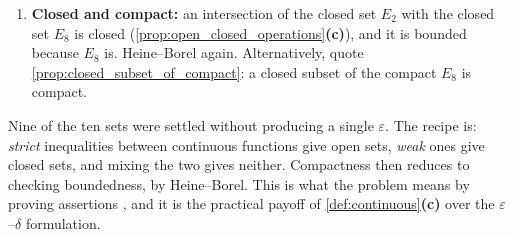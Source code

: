 \begin{exercisesolution}
\begin{enumerate}[label=\textbf{\arabic*.}]
    \begin{ainote}
    The official solution opens this part with . That
    is a slip: $E_8 = [-6,6]^n$ is bounded --- it is $E_3$ that is unbounded, as the official
    solution itself established two parts earlier. The conclusion (that $E_9$ is not compact) is
    correct; only the reason is misattributed.
    \end{ainote}
  \item \textbf{Closed and compact:} an intersection of the closed set $E_2$ with the closed
    set $E_8$ is closed (\cref{prop:open_closed_operations}\textbf{(c)}), and it is bounded
    because $E_8$ is. Heine--Borel again. Alternatively, quote
    \cref{prop:closed_subset_of_compact}: a closed subset of the compact $E_8$ is compact.
\end{enumerate}

\begin{remark}
Nine of the ten sets were settled without producing a single $\varepsilon$. The recipe is:
\emph{strict} inequalities between continuous functions give open sets, \emph{weak} ones give
closed sets, and mixing the two gives neither. Compactness then reduces to checking boundedness,
by Heine--Borel. This is what the problem means by proving assertions , and it is
the practical payoff of \cref{def:continuous}\textbf{(c)} over the $\varepsilon$--$\delta$
formulation.
\end{remark}
\end{exercisesolution}

